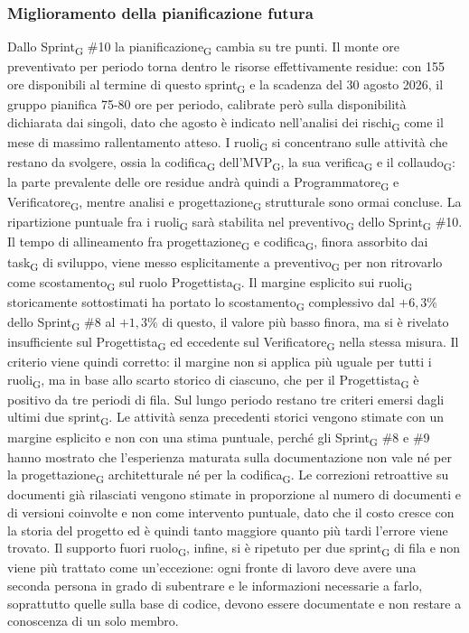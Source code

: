 ﻿\documentclass[a4paper, 10pt, colorlinks=true, linkcolor=black, urlcolor=blue, citecolor=blue, hidelinks]{article}
\begin{document}
\subsubsection{Miglioramento della pianificazione futura}
Dallo Sprint\textsubscript{G} \#10 la pianificazione\textsubscript{G} cambia su tre punti. Il monte ore preventivato per periodo torna dentro le risorse effettivamente residue: con 155 ore disponibili al termine di questo sprint\textsubscript{G} e la scadenza del 30 agosto 2026, il gruppo pianifica 75-80 ore per periodo, calibrate però sulla disponibilità dichiarata dai singoli, dato che agosto è indicato nell'analisi dei rischi\textsubscript{G} come il mese di massimo rallentamento atteso. I ruoli\textsubscript{G} si concentrano sulle attività che restano da svolgere, ossia la codifica\textsubscript{G} dell'MVP\textsubscript{G}, la sua verifica\textsubscript{G} e il collaudo\textsubscript{G}: la parte prevalente delle ore residue andrà quindi a Programmatore\textsubscript{G} e Verificatore\textsubscript{G}, mentre analisi e progettazione\textsubscript{G} strutturale sono ormai concluse. La ripartizione puntuale fra i ruoli\textsubscript{G} sarà stabilita nel preventivo\textsubscript{G} dello Sprint\textsubscript{G} \#10. Il tempo di allineamento fra progettazione\textsubscript{G} e codifica\textsubscript{G}, finora assorbito dai task\textsubscript{G} di sviluppo, viene messo esplicitamente a preventivo\textsubscript{G} per non ritrovarlo come scostamento\textsubscript{G} sul ruolo Progettista\textsubscript{G}.
Il margine esplicito sui ruoli\textsubscript{G} storicamente sottostimati ha portato lo scostamento\textsubscript{G} complessivo dal $+6{,}3\%$ dello Sprint\textsubscript{G} \#8 al $+1{,}3\%$ di questo, il valore più basso finora, ma si è rivelato insufficiente sul Progettista\textsubscript{G} ed eccedente sul Verificatore\textsubscript{G} nella stessa misura. Il criterio viene quindi corretto: il margine non si applica più uguale per tutti i ruoli\textsubscript{G}, ma in base allo scarto storico di ciascuno, che per il Progettista\textsubscript{G} è positivo da tre periodi di fila.
Sul lungo periodo restano tre criteri emersi dagli ultimi due sprint\textsubscript{G}. Le attività senza precedenti storici vengono stimate con un margine esplicito e non con una stima puntuale, perché gli Sprint\textsubscript{G} \#8 e \#9 hanno mostrato che l'esperienza maturata sulla documentazione non vale né per la progettazione\textsubscript{G} architetturale né per la codifica\textsubscript{G}. Le correzioni retroattive su documenti già rilasciati vengono stimate in proporzione al numero di documenti e di versioni coinvolte e non come intervento puntuale, dato che il costo cresce con la storia del progetto ed è quindi tanto maggiore quanto più tardi l'errore viene trovato. Il supporto fuori ruolo\textsubscript{G}, infine, si è ripetuto per due sprint\textsubscript{G} di fila e non viene più trattato come un'eccezione: ogni fronte di lavoro deve avere una seconda persona in grado di subentrare e le informazioni necessarie a farlo, soprattutto quelle sulla base di codice, devono essere documentate e non restare a conoscenza di un solo membro.
\end{document}
